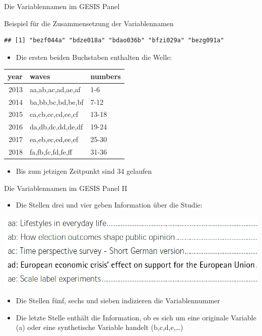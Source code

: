 \documentclass[ignorenonframetext,]{beamer}
\providecommand{\tightlist}{%
  \setlength{\itemsep}{0pt}\setlength{\parskip}{0pt}}
\begin{document}
\begin{frame}[fragile]{Die Variablennamen im GESIS Panel}

\begin{block}{Beispiel für die Zusammensetzung der Variablennamen}

\begin{verbatim}
## [1] "bezf044a" "bdze018a" "bdao036b" "bfzi029a" "bezg091a"
\end{verbatim}

\begin{itemize}
\tightlist
\item
  Die ersten beiden Buchstaben enthalten die Welle:
\end{itemize}

\begin{tabular}{r|l|l}
\hline
year & waves & numbers\\
\hline
2013 & aa,ab,ac,ad,ae,af & 1-6\\
\hline
2014 & ba,bb,bc,bd,be,bf & 7-12\\
\hline
2015 & ca,cb,cc,cd,ce,cf & 13-18\\
\hline
2016 & da,db,dc,dd,de,df & 19-24\\
\hline
2017 & ea,eb,ec,ed,ee,ef & 25-30\\
\hline
2018 & fa,fb,fc,fd,fe,ff & 31-36\\
\hline
\end{tabular}

\begin{itemize}
\tightlist
\item
  Bis zum jetzigen Zeitpunkt sind 34 gelaufen
\end{itemize}

\end{block}

\end{frame}

\begin{frame}{Die Variablennamen im GESIS Panel II}

\begin{itemize}
\tightlist
\item
  Die Stellen drei und vier geben Information über die Studie:
\end{itemize}

\includegraphics{figure/examplestudies.PNG}

\begin{itemize}
\item
  Die Stellen fünf, sechs und sieben indizieren die Variablennummer
\item
  Die letzte Stelle enthält die Information, ob es sich um eine
  originale Variable (a) oder eine synthetische Variable handelt
  (b,c,d,e,\ldots{})
\end{itemize}

\end{frame}
\end{document}
